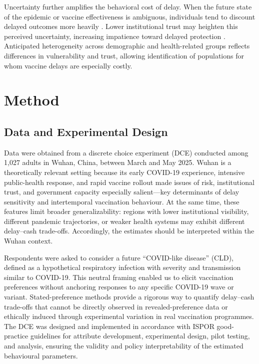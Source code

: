 \documentclass[12pt]{article}
\begin{document}
Uncertainty further amplifies the behavioral cost of delay. When the future state of the 
epidemic or vaccine effectiveness is ambiguous, individuals tend to discount delayed 
outcomes more heavily \citep{Attema2013}. Lower institutional trust may heighten this 
perceived uncertainty, increasing impatience toward delayed protection \parencite{Liu2021}. 
Anticipated heterogeneity across demographic and health-related groups reflects differences in 
vulnerability and trust, allowing identification of populations for whom vaccine delays are 
especially costly. 


\section{Method}

\subsection{Data and Experimental Design}

Data were obtained from a discrete choice experiment (DCE) conducted among 1,027 adults in 
Wuhan, China, between March and May 2025. 
 Wuhan is a theoretically relevant setting because 
its early COVID-19 experience, intensive public-health response, and rapid vaccine rollout 
made issues of risk, institutional trust, and government capacity especially salient—key 
determinants of delay sensitivity and intertemporal vaccination behaviour. At the same time, 
these features limit broader generalizability: regions with lower institutional visibility, 
different pandemic trajectories, or weaker health systems may exhibit different delay–cash 
trade-offs. Accordingly, the estimates should be interpreted within the Wuhan context.

Respondents were asked to consider a future “COVID-like disease” (CLD), defined as a 
hypothetical respiratory infection with severity and transmission similar to COVID-19. This 
neutral framing enabled us to elicit vaccination preferences without anchoring responses to 
any specific COVID-19 wave or variant. Stated-preference methods provide a rigorous way to quantify delay–cash trade-offs that 
cannot be directly observed in revealed-preference data or ethically induced through 
experimental variation in real vaccination programmes. The DCE was designed and implemented 
in accordance with ISPOR good-practice guidelines for attribute development, experimental 
design, pilot testing, and analysis, ensuring the validity and policy interpretability of  
the estimated behavioural parameters.
\end{document}
